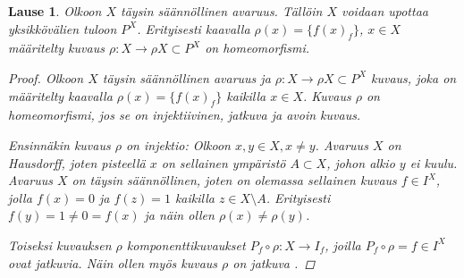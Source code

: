 \documentclass[12pt,a4paper,leqno]{report}
\theoremstyle{plain}
\newtheorem{lause}[equation]{Lause}
\theoremstyle{definition}
\theoremstyle{remark}
\begin{document}
\begin{lause}\label{comp_reg_upotus}
Olkoon $X$ täysin säännöllinen avaruus. 
Tällöin $X$ voidaan upottaa yksikkövälien tuloon $P^X$. 
Erityisesti kaavalla $\rho(x)=\{f(x)_f\}$, $x\in X $ määritelty 
kuvaus $\rho\colon X\rightarrow \rho X\subset P^X$ on homeomorfismi. 
\begin{proof}
Olkoon $X$ täysin säännöllinen avaruus ja 
$\rho\colon X\rightarrow 
\rho X\subset 
P^X$ kuvaus, 
joka on määritelty kaavalla $\rho(x)=\{f(x)_f\}$ kaikilla $x\in X $. 
Kuvaus $\rho$ on homeomorfismi, jos se on injektiivinen, jatkuva ja avoin kuvaus. 

Ensinnäkin kuvaus $\rho$ on injektio: 
Olkoon $x,y\in X, x\neq y$. 
Avaruus $X$ on Hausdorff, 
joten pisteellä $x$ on sellainen ympäristö $A\subset X$, 
johon alkio $y$ ei kuulu. 
Avaruus $X$ on täysin säännöllinen, 
joten on olemassa sellainen kuvaus $f\in I^X$, 
jolla $f(x)=0$ ja $f(z)=1$ kaikilla $z\in X\setminus A$. 
Erityisesti $f(y)=1\neq 0=f(x)$ ja näin ollen $\rho(x)\neq \rho(y)$. 
%

Toiseksi kuvauksen $\rho$ komponenttikuvaukset 
$P_f\circ\rho\colon X\rightarrow I_f$, joilla $P_f\circ\rho=f\in I^X$ 
ovat jatkuvia. 
Näin ollen myös kuvaus $\rho$ on jatkuva \cite[lause~7.10]{Topo2}. 


\end{proof}
\end{lause}
\end{document}
